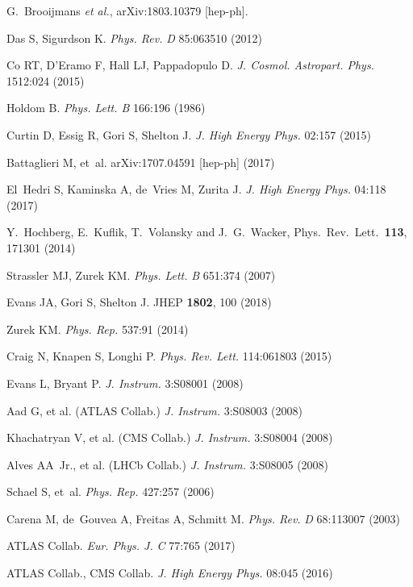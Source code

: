 \documentclass{ar-1col}
\begin{document}
\begin{thebibliography}{175}
  G.~Brooijmans {\it et al.}, arXiv:1803.10379 [hep-ph].
  
Das S, Sigurdson K. \textit{Phys. Rev.} \textit{D} 85:063510 (2012)

Co RT, D'Eramo F, Hall LJ, Pappadopulo D. \textit{J. Cosmol. Astropart. Phys.} 1512:024
(2015)

Holdom B. \textit{Phys. Lett. B} 166:196 (1986)

Curtin D, Essig R, Gori S, Shelton J. \textit{J. High Energy Phys.} 02:157 (2015)

Battaglieri M, et~al. arXiv:1707.04591 [hep-ph] (2017)

El~Hedri S, Kaminska A, de~Vries M, Zurita J. \textit{J. High Energy Phys.} 04:118
(2017)

  Y.~Hochberg, E.~Kuflik, T.~Volansky and J.~G.~Wacker,  Phys.\ Rev.\ Lett.\  {\bf 113}, 171301 (2014)
  
Strassler MJ, Zurek KM. \textit{Phys. Lett.} \textit{B} 651:374 (2007)

Evans JA, Gori S, Shelton J. JHEP {\bf 1802}, 100 (2018)

Zurek KM. \textit{Phys. Rep.} 537:91 (2014)

Craig N, Knapen S, Longhi P. \textit{Phys. Rev. Lett.} 114:061803
(2015)

Evans L, Bryant P. \textit{{J. Instrum.}} 3:{S08001} (2008)

{{Aad G, et al. (ATLAS Collab.)}} \textit{{J. Instrum.}} 3:{S08003} (2008)

{{Khachatryan V, et al. (CMS Collab.)}} \textit{{J. Instrum.}} 3:{S08004} (2008)

{{Alves AA\ Jr., et al. (LHCb Collab.)}} \textit{{J. Instrum.}} 3:{S08005} (2008)

Schael S, et~al. \textit{Phys. Rep.} 427:257 (2006)

Carena M, de~Gouvea A, Freitas A, Schmitt M. \textit{Phys. Rev.}
\textit{D} 68:113007 (2003)

{ATLAS Collab.} \textit{Eur. Phys. J.} \textit{C} 77:765 (2017)

{ATLAS Collab., CMS Collab}. \textit{J. High Energy Phys.} 08:045 (2016)


\end{thebibliography}
\end{document}
